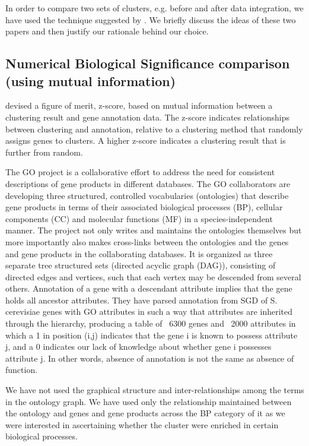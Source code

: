 In order to compare two sets of clusters, e.g. before and after data integration, we have used the technique suggested by \citet{Gibons2002Judging}. We briefly discuss 
the ideas of these two papers and then justify our rationale behind our choice.

\subsection{Numerical Biological Significance comparison (using mutual information)} \label{semisup:num_biosig_mi}
\citet{Gibons2002Judging} devised a figure of merit, z-score, based on mutual information between a clustering result and gene annotation data. The z-score indicates relationships between 
clustering and annotation, relative to a clustering method that randomly assigns genes to clusters. A higher z-score indicates a clustering result that is further 
from random. 

The GO  project is a collaborative effort to address the need for consistent descriptions of gene products in different databases. The GO collaborators are developing three structured, controlled vocabularies (ontologies) that describe gene products in terms of their associated biological processes (BP), 
cellular components (CC) and molecular functions (MF) in a species-independent manner. The project not only writes 
and maintains the ontologies themselves but more importantly also makes cross-links between the ontologies and the genes and gene products in the collaborating databases. 
It is organized as three separate tree structured sets (directed acyclic graph (DAG)), consisting of directed edges and vertices, such that each vertex may be 
descended from several others. Annotation of a gene with a descendant attribute implies that the 
gene holds all ancestor attributes. They have parsed annotation from SGD of S. cerevisiae genes with GO attributes in such a way that attributes are inherited 
through the hierarchy, producing a table of \string~6300 genes and \string~2000 attributes in which a 1 in position (i,j) indicates that the gene i is known to possess attribute 
j, and a 0 indicates our lack of knowledge about whether gene i possesses attribute j. In other words, absence of annotation is not the same as absence of function.

We have not used the graphical structure and inter-relationships among the terms in the ontology graph. We have used only the relationship maintained between the 
ontology and genes and gene products across the BP category of it as we were interested in ascertaining whether the cluster were enriched in certain biological processes.

